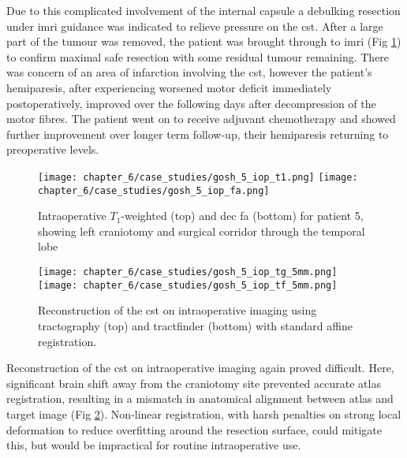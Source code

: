 Due to this complicated involvement of the internal capsule a debulking resection under \gls{imri} guidance was indicated to relieve pressure on the \gls{cst}.
After a large part of the tumour was removed, the patient was brought through to \gls{imri} (Fig \ref{fig:5i}) to confirm maximal safe resection with some residual tumour remaining.
There was concern of an area of infarction involving the \gls{cst}, however the patient's hemiparesis, after experiencing worsened motor deficit immediately postoperatively, improved over the following days after decompression of the motor fibres.
The patient went on to receive adjuvant chemotherapy and showed further improvement over longer term follow-up, their hemiparesis returning to preoperative levels.

\begin{figure}[htb!]
  \centering
  \texttt{[image: chapter\_6/case\_studies/gosh\_5\_iop\_t1.png]}
  \texttt{[image: chapter\_6/case\_studies/gosh\_5\_iop\_fa.png]}
  \caption{Intraoperative $T_1$-weighted (top) and \gls{dec} \gls{fa} (bottom) for patient 5, showing left craniotomy and surgical corridor through the temporal lobe}
  \label{fig:5i}
\end{figure}

\begin{figure}[htb!]
  \centering
  \texttt{[image: chapter\_6/case\_studies/gosh\_5\_iop\_tg\_5mm.png]}
  \texttt{[image: chapter\_6/case\_studies/gosh\_5\_iop\_tf\_5mm.png]}
  \caption{Reconstruction of the \gls{cst} on intraoperative imaging using tractography (top) and tractfinder (bottom) with standard affine registration.}
  \label{fig:5i_cst}
\end{figure}

Reconstruction of the \gls{cst} on intraoperative imaging again proved difficult.
Here, significant brain shift away from the craniotomy site prevented accurate atlas registration, resulting in a mismatch in anatomical alignment between atlas and target image (Fig \ref{fig:5i_cst}).
Non-linear registration, with harsh penalties on strong local deformation to reduce overfitting around the resection surface, could mitigate this, but would be impractical for routine intraoperative use.
